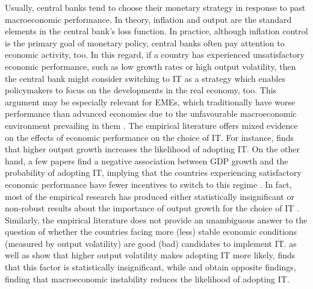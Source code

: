 \documentclass{article}
\begin{document}
Usually, central banks tend to choose their monetary strategy in response to past macroeconomic performance. In theory, inflation and output are the standard elements in the central bank’s loss function. In practice, although inflation control is the primary goal of monetary policy, central banks often pay attention to economic activity, too. In this regard, if a country has experienced unsatisfactory economic performance, such as low growth rates or high output volatility, then the central bank might consider switching to IT as a strategy which enables policymakers to focus on the developments in the real economy, too. This argument may be especially relevant for EMEs, which traditionally have worse performance than advanced economies due to the unfavourable macroeconomic environment prevailing in them \citep{Fraga2003}. The empirical literature offers mixed evidence on the effects of economic performance on the choice of IT. For instance, \citet{lucotte2012} finds that higher output growth increases the likelihood of adopting IT. On the other hand, a few papers find a negative association between GDP growth and the probability of adopting IT, implying that the countries experiencing satisfactory economic performance have fewer incentives to switch to this regime \citep{Ardakani2018, Hu2006}. In fact, most of the empirical research has produced either statistically insignificant or non-robust results about the importance of output growth for the choice of IT \citep{Fouejieu2017, Lin2010, Lin2007, Lin2009, Pontines2013, Samarina2014, Thornton2017, Wang2016}. Similarly, the empirical literature does not provide an unambiguous answer to the question of whether the countries facing more (less) stable economic conditions (measured by output volatility) are good (bad) candidates to implement IT. \citet{mukherjee2008} as well as \citet{samarina2014} show that higher output volatility makes adopting IT more likely, \citet{hu2006} finds that this factor is statistically insignificant, while \citet{samarina2014} and \citet{stojanovikj2019} obtain opposite findings, finding that macroeconomic instability reduces the likelihood of adopting IT.
\end{document}
